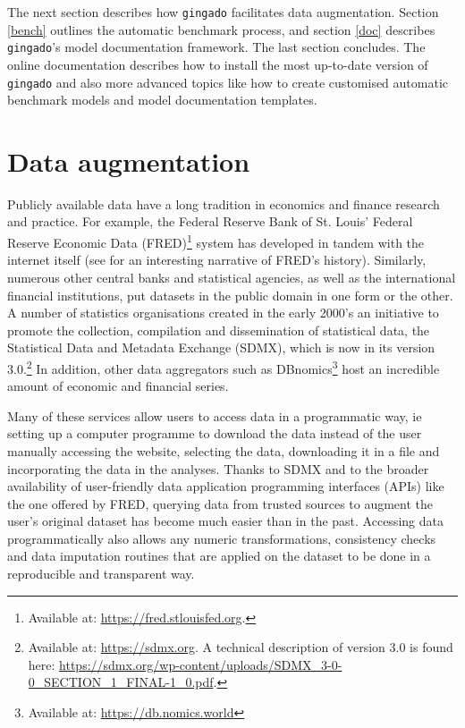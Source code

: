 \documentclass{article}
\begin{document}
The next section describes how \texttt{gingado} facilitates data augmentation. Section \ref{bench} outlines the automatic benchmark process, and section \ref{doc} describes \texttt{gingado}'s model documentation framework. The last section concludes. The online documentation describes how to install the most up-to-date version of \texttt{gingado} and also more advanced topics like how to create customised automatic benchmark models and model documentation templates.

\section{Data augmentation} \label{data_augm}
Publicly available data have a long tradition in economics and finance research and practice. For example, the Federal Reserve Bank of St. Louis' Federal Reserve Economic Data (FRED)\footnote{Available at: \url{https://fred.stlouisfed.org}.} system has developed in tandem with the internet itself (see \cite{RePEc:fip:fedlrv:00023} for an interesting narrative of FRED's history). Similarly, numerous other central banks and statistical agencies, as well as the international financial institutions, put datasets in the public domain in one form or the other. A number of statistics organisations created in the early 2000's an initiative to promote the collection, compilation and dissemination of statistical data, the Statistical Data and Metadata Exchange (SDMX), which is now in its version 3.0.\footnote{Available at: \url{https://sdmx.org}. A technical description of version 3.0 is found here: \url{https://sdmx.org/wp-content/uploads/SDMX_3-0-0_SECTION_1_FINAL-1_0.pdf}.} In addition, other data aggregators such as DBnomics\footnote{Available at: \url{https://db.nomics.world}} host an incredible amount of economic and financial series. 

Many of these services allow users to access data in a programmatic way, ie setting up a computer programme to download the data instead of the user manually accessing the website, selecting the data, downloading it in a file and incorporating the data in the analyses. Thanks to SDMX and to the broader availability of user-friendly data application programming interfaces (APIs) like the one offered by FRED, querying data from trusted sources to augment the user's original dataset has become much easier than in the past. Accessing data programmatically also allows any numeric transformations, consistency checks and data imputation routines that are applied on the dataset to be done in a reproducible and transparent way.
\end{document}
